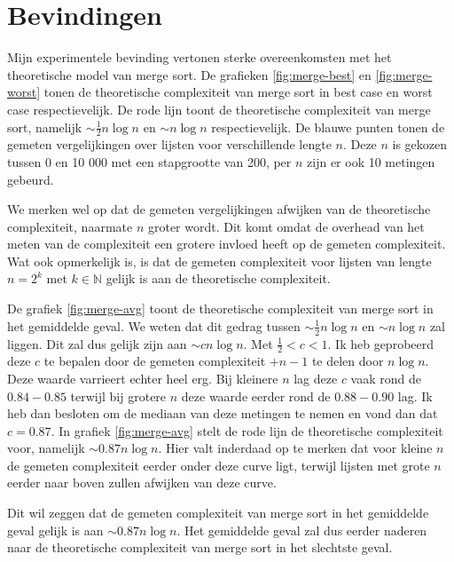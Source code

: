 \documentclass[a4paper]{article}
\begin{document}
\section{Bevindingen}
Mijn experimentele bevinding vertonen sterke overeenkomsten met het theoretische model van merge sort.
De grafieken \ref{fig:merge-best} en \ref{fig:merge-worst} tonen de theoretische complexiteit van merge sort in best case en worst case respectievelijk.
De rode lijn toont de theoretische complexiteit van merge sort, namelijk $\sim \frac{1}{2} n \log n$ en $\sim n \log n$ respectievelijk.
De blauwe punten tonen de gemeten vergelijkingen over lijsten voor verschillende lengte $n$. 
Deze $n$ is gekozen tussen 0 en 10 000 met een stapgrootte van 200, per $n$ zijn er ook 10 metingen gebeurd.
\par
We merken wel op dat de gemeten vergelijkingen afwijken van de theoretische complexiteit, naarmate $n$ groter wordt.
Dit komt omdat de overhead van het meten van de complexiteit een grotere invloed heeft op de gemeten complexiteit.
Wat ook opmerkelijk is, is dat de gemeten complexiteit voor lijsten van lengte $n=2^k$ met $k \in \mathbb{N}$ gelijk is aan de theoretische complexiteit.
\par
De grafiek \ref{fig:merge-avg} toont de theoretische complexiteit van merge sort in het gemiddelde geval.
We weten dat dit gedrag tussen $\sim \frac{1}{2} n \log n$ en $\sim n \log n$ zal liggen. Dit zal dus gelijk zijn aan $\sim cn \log n$. Met $\frac{1}{2}<c<1$.
Ik heb geprobeerd deze $c$ te bepalen door de gemeten complexiteit $+n-1$ te delen door $n \log n$. Deze waarde varrieert echter heel erg.
Bij kleinere $n$ lag deze $c$ vaak rond de $0.84-0.85$ terwijl bij grotere $n$ deze waarde eerder rond de $0.88-0.90$ lag.
Ik heb dan besloten om de mediaan van deze metingen te nemen en vond dan dat $c=0.87$. In grafiek \ref{fig:merge-avg} stelt de rode lijn de theoretische complexiteit voor, namelijk $\sim 0.87n \log n$.
Hier valt inderdaad op te merken dat voor kleine $n$ de gemeten complexiteit eerder onder deze curve ligt, terwijl lijsten met grote $n$ eerder naar boven zullen afwijken van deze curve.
\par
Dit wil zeggen dat de gemeten complexiteit van merge sort in het gemiddelde geval gelijk is aan $\sim 0.87n \log n$.
Het gemiddelde geval zal dus eerder naderen naar de theoretische complexiteit van merge sort in het slechtste geval.
\end{document}
